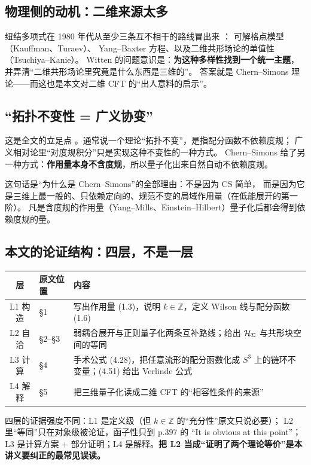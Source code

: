\subsection{物理侧的动机：二维来源太多}
纽结多项式在 1980 年代从至少三条互不相干的路线冒出来 ：
可解格点模型（Kauffman、Turaev）\cite{kauffman1987,turaev1988}、
Yang--Baxter 方程、以及二维共形场论的单值性（Tsuchiya--Kanie）\cite{tuj}。
Witten 的问题意识是：\textbf{为这种多样性找到一个统一主题}，
并弄清“二维共形场论里究竟是什么东西是三维的”。
答案就是 Chern--Simons 理论——而这也是本文对二维 CFT 的“出人意料的启示”。

\subsection{“拓扑不变性 = 广义协变”}
这是全文的立足点 。通常说一个理论“拓扑不变”，是指配分函数不依赖度规；
广义相对论里“对度规积分”只是实现这种不变性的一种方式。
Chern--Simons 给了另一种方式：\textbf{作用量本身不含度规}，所以量子化出来自然自动不依赖度规。
\begin{keypoint}[读法]
这句话是“为什么是 Chern--Simons”的全部理由：不是因为 CS 简单，
而是因为它是三维上最一般的、只依赖定向的、规范不变的局域作用量（在低能展开的第一阶）。
凡是含度规的作用量（Yang--Mills、Einstein--Hilbert）量子化后都会得到依赖度规的量。
\end{keypoint}

\subsection{本文的论证结构：四层，不是一层}
\begin{center}
\begin{tabular}{@{}clp{8.2cm}@{}}
\toprule
层 & 原文位置 & 内容 \\
\midrule
L1 构造 & \S1 & 写出作用量 (1.3)，说明 $k\in\mathbb Z$，定义 Wilson 线与配分函数 (1.6) \\
L2 自洽 & \S2--\S3 & 弱耦合展开与正则量子化两条互补路线；给出 $\mathcal{H}_\Sigma$ 与共形块空间的等同 \\
L3 计算 & \S4 & 手术公式 (4.28)，把任意流形的配分函数化成 $S^3$ 上的链环不变量；(4.51) 给出 Verlinde 公式 \\
L4 解释 & \S5 & 把三维量子化读成二维 CFT 的“相容性条件的来源” \\
\bottomrule
\end{tabular}
\end{center}
四层的证据强度不同：L1 是定义级（但 $k\in\mathbb Z$ 的“充分性”原文只说必要）；
L2 里“等同”只在对象级被论证，函子性只到 p.397 的 “It is obvious at this point”；
L3 是计算方案 + 部分证明；L4 是解释。\textbf{把 L2 当成“证明了两个理论等价”是本讲义要纠正的最常见误读。}

